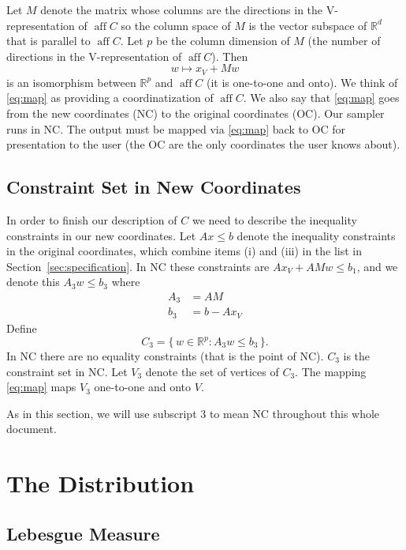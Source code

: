 \documentclass[11pt]{article}
\DeclareMathOperator{\aff}{aff}
\newcommand{\real}{\mathbb{R}}
\newcommand{\set}[1]{\{\, #1 \,\}}
\begin{document}
Let $M$ denote the matrix whose columns are the directions in the
V-representation of $\aff C$ so the column space of $M$ is the vector
subspace of $\real^d$ that is parallel to $\aff C$.  Let $p$ be the
column dimension of $M$ (the number of directions in the V-representation
of $\aff C$).  Then
\begin{equation} \label{eq:map}
   w \mapsto x_V + M w
\end{equation}
is an isomorphism between $\real^p$ and $\aff C$ (it is one-to-one and onto).
We think of \eqref{eq:map} as providing a coordinatization of $\aff C$.
We also say that \eqref{eq:map} goes from the new coordinates (NC) to
the original coordinates (OC).  Our sampler runs in NC.  The output
must be mapped via \eqref{eq:map} back to OC for presentation to the user
(the OC are the only coordinates the user knows about).

\subsection{Constraint Set in New Coordinates}

In order to finish our description of $C$ we need to describe the inequality
constraints in our new coordinates.  Let $A x \le b$ denote the inequality
constraints in the original coordinates, which combine items (i) and (iii)
in the list in Section~\ref{sec:specification}.
In NC these constraints are $A x_V + A M w \le b_1$,
and we denote this $A_3 w \le b_3$ where
\begin{align*}
   A_3 & = A M
   \\
   b_3 & = b - A x_V
\end{align*}
Define
$$
   C_3 = \set{ w \in \real^p : A_3 w \le b_3 }.
$$
In NC there are no equality constraints (that is the point of NC).
$C_3$ is the constraint set in NC.
Let $V_3$ denote the set of vertices of $C_3$.
The mapping \eqref{eq:map} maps $V_3$ one-to-one and onto $V$.

As in this section, we will use subscript 3 to mean NC throughout
this whole document.

\section{The Distribution}

\subsection{Lebesgue Measure} \label{sec:lebesgue}
\end{document}
